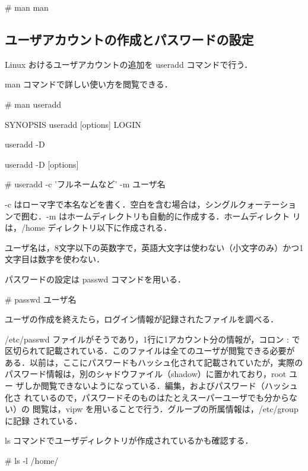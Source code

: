 \begin{cli}
# man man
\end{cli}

\subsection{ユーザアカウントの作成とパスワードの設定}
Linux おけるユーザアカウントの追加を useradd コマンドで行う．

man コマンドで詳しい使い方を閲覧できる．

\begin{cli}
# man useradd

SYNOPSIS
       useradd [options] LOGIN

       useradd -D

       useradd -D [options]
\end{cli}

\begin{cli}
# useradd -c 'フルネームなど' -m ユーザ名
\end{cli}

-c はローマ字で本名などを書く．空白を含む場合は，シングルクォーテーショ
ン\'で囲む．-m はホームディレクトリも自動的に作成する．ホームディレクト
リは，/home ディレクトリ以下に作成される．

ユーザ名は，8文字以下の英数字で，英語大文字は使わない（小文字のみ）かつ1
文字目は数字を使わない．

パスワードの設定は passwd コマンドを用いる．

\begin{cli}
# passwd ユーザ名
\end{cli}

ユーザの作成を終えたら，ログイン情報が記録されたファイルを調べる．

/etc/passwd ファイルがそうであり，1行に1アカウント分の情報が，コロン : 
で区切られて記載されている．このファイルは全てのユーザが閲覧できる必要が
ある．以前は，ここにパスワードもハッシュ化されて記載されていたが，実際の
パスワード情報は，別のシャドウファイル（shadow）に置かれており，root ユー
ザしか閲覧できないようになっている．編集，およびパスワード（ハッシュ化さ
れているので，パスワードそのものはたとえスーパーユーザでも分からない）の
閲覧は，vipw を用いることで行う．グループの所属情報は，/etc/group に記録
されている．

ls コマンドでユーザディレクトリが作成されているかも確認する．

\begin{cli}
# ls -l /home/
\end{cli}


